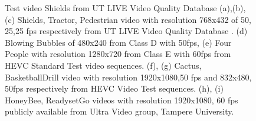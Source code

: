 \documentclass{book}
\begin{document}
\begin{figure}[bt!]
{		\label{fig:Ch4BBDrill}}	

	 
	\caption{\label{fig:x265Video_Databases}
		Test video Shields from UT LIVE Video Quality Database \cite{Kalpana}
		(a),(b),(c) Shields, Tractor, Pedestrian video with resolution 768x432 of 50, 25,25 fps respectively  from UT LIVE Video Quality Database .
		(d) Blowing Bubbles of 480x240 from Class D with 50fps,
		(e) Four People with resolution 1280x720 from Class E with 60fps from HEVC Standard Test video sequences.
		(f), (g) Cactus, BasketballDrill video with resolution 1920x1080,50 fps and 832x480, 50fps respectively from HEVC \cite{HEVCTestvideo} Video Test sequences.
		(h), (i) HoneyBee, ReadysetGo videos with resolution 1920x1080, 60 fps publicly available from Ultra Video group, Tampere \cite{UHDvideo} University.
		}	
\end{figure}
\end{document}
